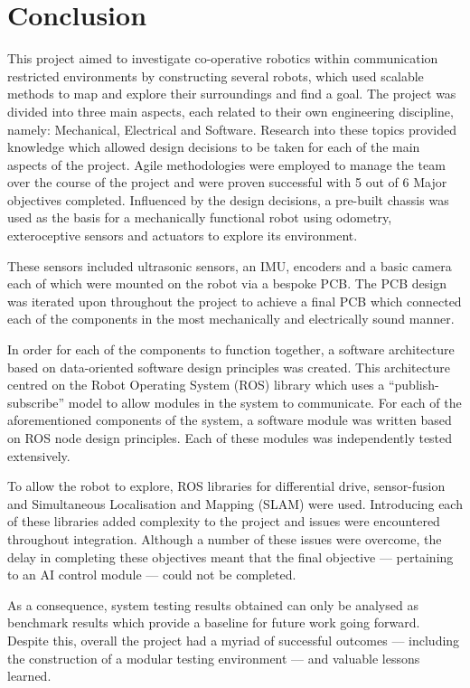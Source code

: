 
\chapter{Conclusion}\label{conclusion}
This project aimed to investigate co-operative robotics within 
communication restricted environments by constructing several robots, 
which used scalable methods to map and explore their surroundings and find 
a goal. The project was divided into three main aspects, each related to 
their own engineering discipline, namely: Mechanical, Electrical and 
Software. Research into these topics provided knowledge which allowed 
design decisions to be taken for each of the main aspects of the project. 
Agile methodologies were employed to manage the team over the course of 
the project and were proven successful with 5 out of 6 Major objectives 
completed. Influenced by the design decisions, a pre-built chassis was 
used as the basis for a mechanically functional robot using odometry, 
exteroceptive sensors and actuators to explore its environment. 

These sensors included ultrasonic sensors, an IMU, encoders and a basic 
camera each of which were mounted on the robot via a bespoke PCB. The PCB 
design was iterated upon throughout the project to achieve a final PCB 
which connected each of the components in the most mechanically and 
electrically sound manner. 

In order for each of the components to function together, a software 
architecture based on data-oriented software design principles was 
created. This architecture centred on the Robot Operating System (ROS) 
library which uses a ``publish-subscribe'' model to allow modules in the 
system to communicate. For each of the aforementioned components of the 
system, a software module was written based on ROS node design principles. 
Each of these modules was independently tested extensively. 

To allow the robot to explore, ROS libraries for differential drive, 
sensor-fusion and Simultaneous Localisation and Mapping (SLAM) were used. 
Introducing each of these libraries added complexity to the project and 
issues were encountered throughout integration. Although a number of these 
issues were overcome, the delay in completing these objectives meant that 
the final objective --- pertaining to an AI control module --- could not 
be completed. 

As a consequence, system testing results obtained can only be analysed as 
benchmark results which provide a baseline for future work going forward. 
Despite this, overall the project had a myriad of successful outcomes --- including 
the construction of a modular testing environment --- and 
valuable lessons learned.      
